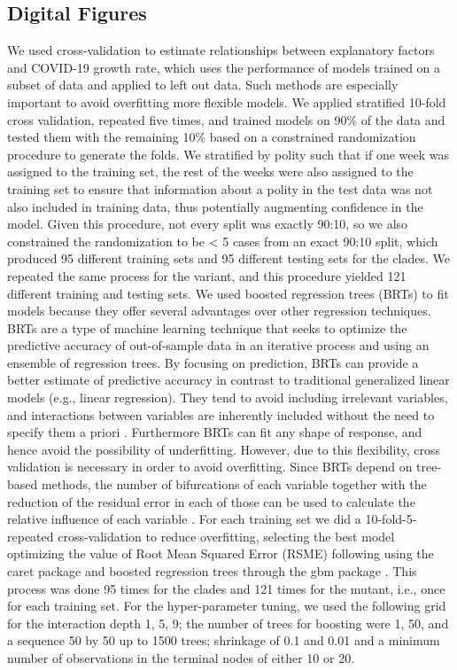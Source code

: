\documentclass[9pt,twocolumn,twoside,lineno]{pnas-new}
\begin{document}
{\subsection*{Digital Figures}

We used cross-validation to estimate relationships between explanatory factors and COVID-19 growth rate, which uses the performance of models trained on a subset of data and applied to left out data. Such methods are especially important to avoid overfitting more flexible models. We applied stratified 10-fold cross validation, repeated five times, and trained models on 90\% of the data and tested them with the remaining 10\% based on a constrained randomization procedure to generate the folds. We stratified by polity such that if one week was assigned to the training set, the rest of the weeks were also assigned to the training set to ensure that information about a polity in the test data was not also included in training data, thus potentially augmenting confidence in the model. Given this procedure, not every split was exactly 90:10, so we also constrained the randomization to be < 5 cases from an exact 90:10 split, which produced 95 different training sets and 95 different testing sets for the clades. We repeated the same process for the variant, and this procedure yielded 121 different training and testing sets.
We used boosted regression trees (BRTs) to fit models because they offer several advantages over other regression techniques. BRTs are a type of machine learning technique that seeks to optimize the predictive accuracy of out-of-sample data in an iterative process and using an ensemble of regression trees. By focusing on prediction, BRTs can provide a better estimate of predictive accuracy in contrast to traditional generalized linear models (e.g., linear regression). They tend to avoid including irrelevant variables, and interactions between variables are inherently included without the need to specify them a priori \cite{Friedman2001-vj, Friedman2003-tl}. Furthermore BRTs can fit any shape of response, and hence avoid the possibility of underfitting. However, due to this flexibility, cross validation is necessary in order to avoid overfitting. Since BRTs depend on tree-based methods, the number of bifurcations of each variable together with the reduction of the residual error in each of those can be used to calculate the relative influence of each variable \cite{Friedman2008-ep, Greenwell2020-lk}. 
For each training set we did a 10-fold-5-repeated cross-validation to reduce overfitting, selecting the best model optimizing the value of Root Mean Squared Error (RSME) following \cite{Kuhn2013-cp} using the caret package \cite{Kuhn2008-cc} and boosted regression trees through the gbm package \cite{Greenwell2020-lk}. This process was done 95 times for the clades and 121 times for the mutant, i.e., once for each training set. For the hyper-parameter tuning, we used the following grid for the interaction depth 1, 5, 9; the number of trees for boosting were 1, 50, and a sequence 50 by 50 up to 1500 trees; shrinkage of 0.1 and 0.01 and a minimum number of observations in the terminal nodes of either 10 or 20.
}
\end{document}
